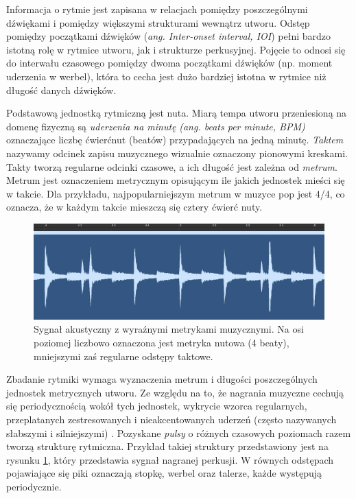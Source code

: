 \documentclass[12pt,a4paper,twoside]{mwart}
\begin{document}
Informacja o rytmie jest zapisana w relacjach pomiędzy poszczególnymi dźwiękami i pomiędzy większymi strukturami wewnątrz utworu. Odstęp pomiędzy początkami dźwięków (\textit{ang. Inter-onset interval, IOI}) pełni bardzo istotną rolę w rytmice utworu, jak i strukturze perkusyjnej. Pojęcie to odnosi się do interwału czasowego pomiędzy dwoma początkami dźwięków (np. moment uderzenia w werbel), która to cecha jest dużo bardziej istotna w rytmice niż długość danych dźwięków. \cite[473-500]{Transcription:Clarke:RhythmAndTiming}

Podstawową jednostką rytmiczną jest nuta. Miarą tempa utworu przeniesioną na domenę fizyczną są \textit{uderzenia na minutę} \textit{(ang. beats per minute, BPM)} oznaczające liczbę ćwierćnut (beatów) przypadających na jedną minutę. \textit{Taktem} nazywamy odcinek zapisu muzycznego wizualnie oznaczony pionowymi kreskami. Takty tworzą regularne odcinki czasowe, a ich długość jest zależna od \textit{metrum}. Metrum jest oznaczeniem metrycznym opisującym ile jakich jednostek mieści się w takcie. Dla przykładu, najpopularniejszym metrum w muzyce pop jest 4/4, co oznacza, że w każdym takcie mieszczą się cztery ćwierć nuty.

\begin{figure}[H]
  \begin{center}
    \includegraphics[scale=0.3]{images/RythmMertic.jpg}
    \caption{Sygnał akustyczny z wyraźnymi metrykami muzycznymi. Na osi poziomej liczbowo oznaczona jest metryka nutowa (4 beaty), mniejszymi zaś regularne odstępy taktowe.}
    \label{fig:rythmMertic}
  \end{center}
\end{figure}

Zbadanie rytmiki wymaga wyznaczenia metrum i długości poszczególnych jednostek metrycznych utworu. Ze względu na to, że nagrania muzyczne cechują się periodycznością wokół tych jednostek, wykrycie wzorca regularnych, przeplatanych zestresowanych i nieakcentowanych uderzeń (często nazywanych słabszymi i silniejszymi) \cite[12-35]{Transcription:Lerdahl:GenerativeTheory}. Pozyskane \textit{pulsy} o różnych czasowych poziomach razem tworzą strukturę rytmiczna. Przykład takiej struktury przedstawiony jest na rysunku \ref{fig:rythmMertic}, który przedstawia sygnał nagranej perkusji. W równych odstępach pojawiające się piki oznaczają stopkę, werbel oraz talerze, każde występują periodycznie.
\end{document}
